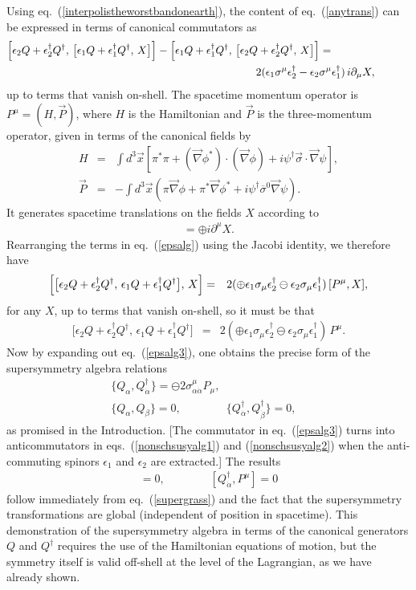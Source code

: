 \documentclass[12pt]{article}
\def\BDpos{}
\def\BDneg{-}
\def\BDplus{+}
\def\BDpos{-}
\def\BDneg{}
\def\BDplus{-}
\def\BDpos{\oplus}
\def\BDneg{\ominus}
\def\BDplus{\oplus}
\def\BDpos{\ominus}
\def\BDneg{\oplus}
\def\BDplus{\ominus}
\def\beq{\begin{eqnarray}}
\def\eeq{\end{eqnarray}}
\def\sigmabar{\overline\sigma}
\begin{document}
Using eq.~(\ref{interpolistheworstbandonearth}), the content of
eq.~(\ref{anytrans}) can be expressed in terms of canonical commutators as
\beq
\Bigl [
\epsilon_2 Q + \epsilon_2^\dagger Q^\dagger,\,
\bigl [
\epsilon_1 Q + \epsilon_1^\dagger Q^\dagger
,\, X
\bigr ] \Bigr ]
-
\Bigl [
\epsilon_1 Q + \epsilon_1^\dagger Q^\dagger,\,
\bigl [
\epsilon_2 Q + \epsilon_2^\dagger Q^\dagger
,\, X
\bigr ] \Bigr ]
=\qquad\qquad &&
\nonumber
\\
2( \epsilon_1 \sigma^\mu \epsilon_2^\dagger
  -\epsilon_2 \sigma^\mu \epsilon_1^\dagger)\, i\partial_\mu X
,&&
\qquad\>{}
\label{epsalg}
\eeq
up to terms that vanish on-shell. The spacetime momentum operator is
$P^\mu = (H, \vec{P})$, where $H$ is the Hamiltonian and $\vec{P}$ is the
three-momentum operator, given in terms of the canonical fields by
\beq
H &=& 
\int d^3\vec{x} \left [
\pi^*\pi + 
(\vec{\nabla} \phi^*)
\cdot (\vec{\nabla} \phi)
+ i \psi^\dagger \vec{\sigma} \cdot \vec{\nabla} \psi
\right ] ,
\\
\vec P &=& 
-\int d^3\vec{x} \left (
\pi \vec{\nabla} \phi 
+\pi^* \vec{\nabla} \phi^* 
+ i \psi^\dagger \sigmabar^0 \vec{\nabla} \psi 
\right )
.
\eeq 
It generates spacetime translations on the fields $X$ according to
\beq
[P^\mu, X ] = \BDneg i \partial^\mu X.
\label{supergrass}
\eeq
Rearranging the terms in eq.~(\ref{epsalg}) using the Jacobi identity,
we therefore have
\beq
\Bigl [ \bigl [
\epsilon_2 Q + \epsilon_2^\dagger Q^\dagger,\,
\epsilon_1 Q + \epsilon_1^\dagger Q^\dagger \bigr ]
,\, X
\Bigr ]
&= & 2(\BDneg\epsilon_1 \sigma_\mu \epsilon_2^\dagger
       \BDplus\epsilon_2 \sigma_\mu \epsilon_1^\dagger )\,  [ P^\mu , X ],
\label{epsalg2}
\eeq
for any $X$, up to terms that vanish on-shell, so it must be that
\beq
 \bigl [
\epsilon_2 Q + \epsilon_2^\dagger Q^\dagger,\,
\epsilon_1 Q + \epsilon_1^\dagger Q^\dagger \bigr ]
&= & 2(\BDneg\epsilon_1 \sigma_\mu \epsilon_2^\dagger
       \BDplus\epsilon_2 \sigma_\mu \epsilon_1^\dagger)\,  P^\mu  .
\label{epsalg3}
\eeq
Now by expanding out eq.~(\ref{epsalg3}), one obtains the precise form of
the supersymmetry algebra relations
\beq
&&\{ Q_\alpha , Q^\dagger_{\dot{\alpha}} \} =
\BDpos 2\sigma^\mu_{\alpha\dot{\alpha}} P_\mu,
\label{nonschsusyalg1}\\
&&\{ Q_\alpha, Q_\beta\} = 0
, \qquad\qquad
\{ Q^\dagger_{\dot{\alpha}}, Q^\dagger_{\dot{\beta}} \} = 0
,
\phantom{XXX}
\label{nonschsusyalg2}
\eeq
as promised in the Introduction. [The commutator in eq.~(\ref{epsalg3})
turns into anticommutators in eqs.~(\ref{nonschsusyalg1}) and
(\ref{nonschsusyalg2}) when the anti-commuting
spinors $\epsilon_1$ and $\epsilon_2$ are extracted.] The results
\beq
[Q_\alpha, P^\mu ] = 0, \qquad\qquad [Q^\dagger_{\dot{\alpha}},
P^\mu] = 0
\eeq
follow immediately from eq.~(\ref{supergrass}) and the fact that the
supersymmetry transformations are global (independent of position in
spacetime). This demonstration of the supersymmetry algebra in terms of
the canonical generators $Q$ and $Q^\dagger$ requires the use of the
Hamiltonian equations of motion, but the symmetry itself is valid
off-shell at the level of the Lagrangian, as we have already shown. 
\end{document}
